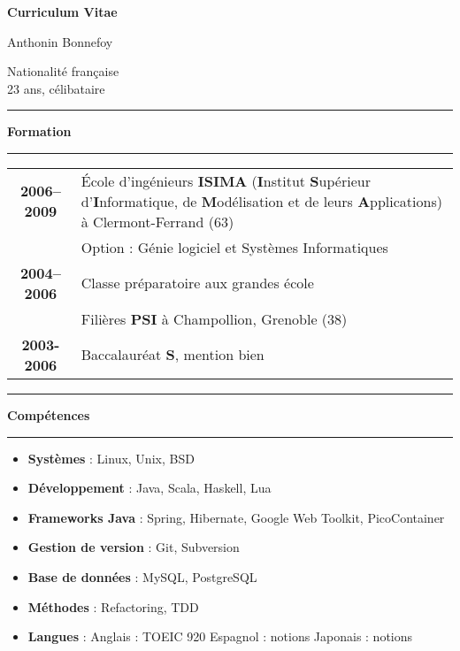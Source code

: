 \documentclass[a4paper,11pt]{article}
\newcommand{\titre}[1]{%
	\begin{center}
	\bigskip
	\rule{\textwidth}{1pt}
	\par\vspace{0.1cm}
        \textbf{\LARGE #1}
	\par\rule{\textwidth}{1pt}
	\end{center}
	\bigskip
}
\begin{document}
\begin{center}
\par\textbf{\huge Curriculum Vitae}
\end{center}

\vspace{1.5cm}


\begin{minipage}{0.48\linewidth}
\begin{flushleft}
Anthonin Bonnefoy\\
\end{flushleft}
\end{minipage}
\hfill
\begin{minipage}{0.48\linewidth}
\begin{flushright}
Nationalité française \\
23 ans, célibataire
\end{flushright}
\end{minipage}

\titre{Formation}

\begin{tabular}{c@{ }p{}}

\textbf{2006--2009} &  École d'ingénieurs \textbf{ISIMA} (\textbf{I}nstitut \textbf{S}upérieur d'\textbf{I}nformatique, de \textbf{M}odélisation et de leurs \textbf{A}pplications) à Clermont-Ferrand (63)\\
& Option : Génie logiciel et Systèmes Informatiques\\

\textbf{2004--2006} &  Classe préparatoire aux grandes école\\
&  Filières \textbf{PSI} à Champollion, Grenoble (38)\\

\textbf{2003-2006} &  Baccalauréat \textbf{S}, mention bien

\end{tabular}

\titre{Compétences}
\begin{itemize} 
\item \textbf{Systèmes} : Linux, Unix, BSD 
\item \textbf{Développement} : Java, Scala, Haskell, Lua
\item \textbf{Frameworks Java} : Spring, Hibernate, Google Web Toolkit, PicoContainer
\item \textbf{Gestion de version} : Git, Subversion
\item \textbf{Base de données} : MySQL, PostgreSQL
\item \textbf{Méthodes} : Refactoring, TDD
\item \textbf{Langues} : Anglais : TOEIC 920 \hfil  Espagnol : notions \hfil Japonais : notions
\end{itemize}
\end{document}
